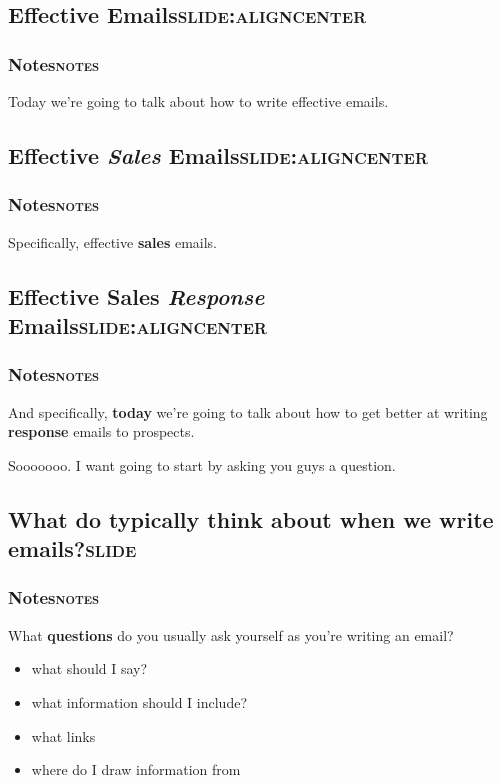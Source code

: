 \documentclass[12pt]{article}
\begin{document}
\subsection[Effective Emails]{Effective Emails\hfill{}\textsc{slide:aligncenter}}
\label{sec:org90d080d}
\subsubsection[Notes]{Notes\hfill{}\textsc{notes}}
\label{sec:org415fb1b}
Today we're going to talk about how to write effective emails.

\subsection[Effective \textit{Sales} Emails]{Effective \textit{Sales} Emails\hfill{}\textsc{slide:aligncenter}}
\label{sec:orga55741a}

\subsubsection[Notes]{Notes\hfill{}\textsc{notes}}
\label{sec:org6b393ff}
Specifically, effective \textbf{sales} emails.
\subsection[Effective Sales \textit{Response} Emails]{Effective Sales \textit{Response} Emails\hfill{}\textsc{slide:aligncenter}}
\label{sec:org11e9202}

\subsubsection[Notes]{Notes\hfill{}\textsc{notes}}
\label{sec:orgf50fed0}
And specifically, \textbf{today} we're going to talk about how to get better at writing \textbf{response} emails to prospects.

Sooooooo. I want going to start by asking you guys a question.

\subsection[What do typically think about when we write emails?]{What do typically think about when we write emails?\hfill{}\textsc{slide}}
\label{sec:orge1f1056}

\subsubsection[Notes]{Notes\hfill{}\textsc{notes}}
\label{sec:org99afe25}
What \textbf{questions} do you usually ask yourself as you're writing an email?
\begin{itemize}
\item what should I say?
\item what information should I include?
\item what links
\item where do I draw information from
\end{itemize}
\end{document}
